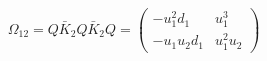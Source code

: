 \begin{equation}
\Omega_{12}= Q \bar{K}_2Q \bar{K}_2 Q  = \left(  \begin{array}{cc}
-u_1^2 d_1  &  u_1^3  \\
-u_1 u_2 d_1 & u_1^2 u_2
\end{array}  \right)
\end{equation}

